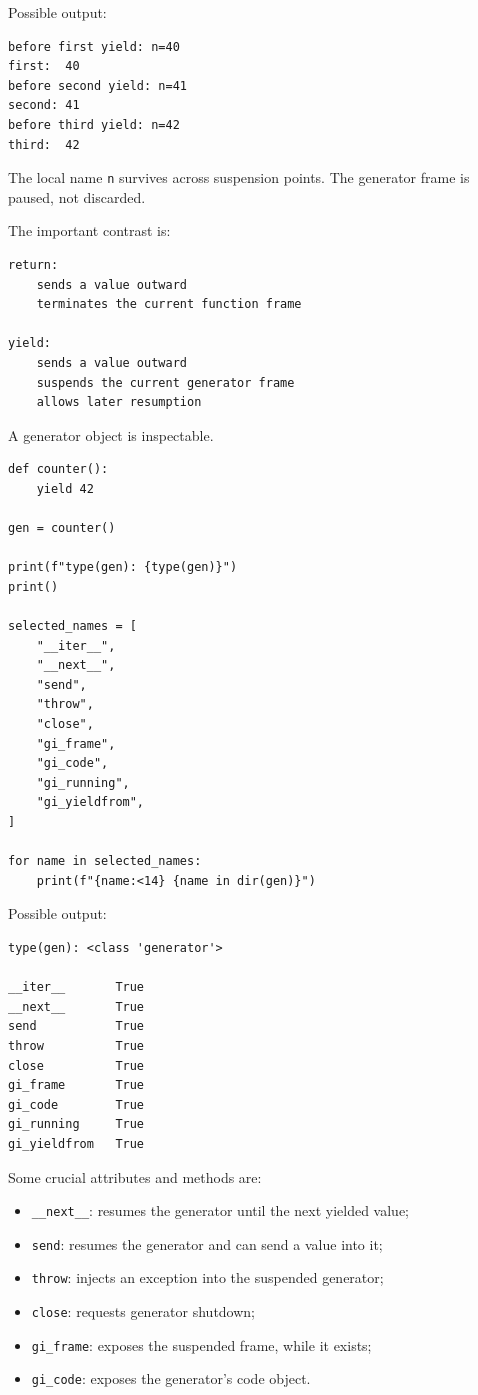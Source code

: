 Possible output:

\begin{verbatim}
before first yield: n=40
first:  40
before second yield: n=41
second: 41
before third yield: n=42
third:  42
\end{verbatim}

The local name \texttt{n} survives across suspension points. The generator frame is paused, not discarded.

The important contrast is:

\begin{verbatim}
return:
    sends a value outward
    terminates the current function frame

yield:
    sends a value outward
    suspends the current generator frame
    allows later resumption
\end{verbatim}

A generator object is inspectable.

\begin{verbatim}
def counter():
    yield 42

gen = counter()

print(f"type(gen): {type(gen)}")
print()

selected_names = [
    "__iter__",
    "__next__",
    "send",
    "throw",
    "close",
    "gi_frame",
    "gi_code",
    "gi_running",
    "gi_yieldfrom",
]

for name in selected_names:
    print(f"{name:<14} {name in dir(gen)}")
\end{verbatim}

Possible output:

\begin{verbatim}
type(gen): <class 'generator'>

__iter__       True
__next__       True
send           True
throw          True
close          True
gi_frame       True
gi_code        True
gi_running     True
gi_yieldfrom   True
\end{verbatim}

Some crucial attributes and methods are:

\begin{itemize}
    \item \texttt{\_\_next\_\_}: resumes the generator until the next yielded value;
    \item \texttt{send}: resumes the generator and can send a value into it;
    \item \texttt{throw}: injects an exception into the suspended generator;
    \item \texttt{close}: requests generator shutdown;
    \item \texttt{gi\_frame}: exposes the suspended frame, while it exists;
    \item \texttt{gi\_code}: exposes the generator's code object.
\end{itemize}


